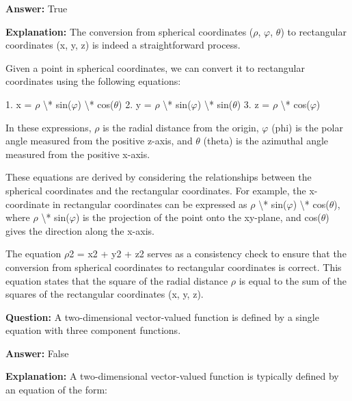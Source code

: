 \documentclass{article}
\begin{document}
                \textbf{Answer:} True

                \textbf{Explanation:} The conversion from spherical coordinates (\ensuremath{\rho}, \ensuremath{\varphi}, \ensuremath{\theta}) to rectangular coordinates (x, y, z) is indeed a straightforward process.

Given a point in spherical coordinates, we can convert it to rectangular coordinates using the following equations:

1. x = \ensuremath{\rho} {\textbackslash}* sin(\ensuremath{\varphi}) {\textbackslash}* cos(\ensuremath{\theta})
2. y = \ensuremath{\rho} {\textbackslash}* sin(\ensuremath{\varphi}) {\textbackslash}* sin(\ensuremath{\theta})
3. z = \ensuremath{\rho} {\textbackslash}* cos(\ensuremath{\varphi})

In these expressions, \ensuremath{\rho} is the radial distance from the origin, \ensuremath{\varphi} (phi) is the polar angle measured from the positive z-axis, and \ensuremath{\theta} (theta) is the azimuthal angle measured from the positive x-axis.

These equations are derived by considering the relationships between the spherical coordinates and the rectangular coordinates. For example, the x-coordinate in rectangular coordinates can be expressed as \ensuremath{\rho} {\textbackslash}* sin(\ensuremath{\varphi}) {\textbackslash}* cos(\ensuremath{\theta}), where \ensuremath{\rho} {\textbackslash}* sin(\ensuremath{\varphi}) is the projection of the point onto the xy-plane, and cos(\ensuremath{\theta}) gives the direction along the x-axis.

The equation \ensuremath{\rho}2 = x2 + y2 + z2 serves as a consistency check to ensure that the conversion from spherical coordinates to rectangular coordinates is correct. This equation states that the square of the radial distance \ensuremath{\rho} is equal to the sum of the squares of the rectangular coordinates (x, y, z).
                
                \vspace{0.5cm} 
        
            
                \textbf {Question:} A two-dimensional vector-valued function is defined by a single equation with three component functions.
                
                \textbf{Answer:} False

                \textbf{Explanation:} A two-dimensional vector-valued function is typically defined by an equation of the form:
\end{document}
